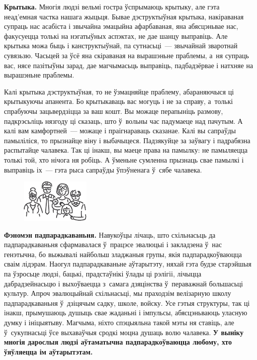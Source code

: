 \textbf{Крытыка.} Многія людзі вельмі гостра ўспрымаюць крытыку, але гэта неад'емная частка нашага жыцьця. Бывае дэструктыўная крытыка, накіраваная супраць нас асабіста і звычайна эмацыйна афарбаваная, яна абясцэньвае нас, факусуецца толькі на нэгатыўных аспэктах, не дае шанцу выправіць. Але крытыка можа быць і канструктыўнай, па сутнасьці~--- звычайнай зваротнай сувязьзю. Часьцей за ўсё яна скіраваная на вырашэньне праблемы, а~ня супраць вас, нясе пазітыўны зарад, дае магчымасьць выправіць, падбадзёрвае і натхняе на вырашэньне праблемы.

Калі крытыка дэструктыўная, то не ўзмацняйце праблему, абараняючыся ці крытыкуючы апанента. Бо крытыкаваць вас могуць і не за справу, а~толькі спрабуючы зацьвердзіцца за ваш кошт. Вы можаце перапыніць размову, падкрэсьліць нязгоду ці сказаць, што ў~вольны час падумаеце над пачутым. А калі вам камфортней~--- можаце і праігнараваць сказанае. Калі вы сапраўды памыліліся, то прызнайце віну і выбачыцеся. Падзякуйце за заўвагу і падрабязна распытайце чалавека. Так ці інакш, вы маеце права на памылку: не памыляецца толькі той, хто нічога ня робіць. А ўменьне сумленна прызнаць свае памылкі і выправіць іх~--- гэта рыса сапраўды ўпэўненага ў~сябе чалавека.

\begin{figure}[htb!]
  \centering
  \includegraphics[scale=1.5]{willpower/ch10/10.pdf}
\end{figure}


\textbf{Фэномэн падпарадкаваньня.} Навукоўцы лічаць, што схільнасьць да падпарадкаваньня сфармавалася ў~працэсе эвалюцыі і закладзена ў~нас генэтычна, бо выжывалі найбольш зладжаныя групы, якія падпарадкоўваюцца сваім лідэрам. Наогул падпарадкаваньне аўтарытэту, няхай гэта будзе старэйшыя па ўзросьце людзі, бацькі, прадстаўнікі ўлады ці рэлігіі, лічыцца дабрадзейнасьцю і выхоўваецца з~самага дзяцінства ў~пераважнай большасьці культур. Апроч эвалюцыйнай схільнасьці, мы праходзім велізарную школу падпарадкаваньня ў~дзіцячым садку, школе, войску. Усе гэтыя структуры, так ці інакш, прымушаюць душыць свае жаданьні і імпульсы, абясцэньваюць уласную думку і ініцыятыву. Магчыма, ніхто спэцыяльна такой мэты ня ставіць, але ў~сукупнасьці ўсе выхаваўчыя сродкі моцна душаць волю чалавека. \textbf{У выніку многія дарослыя людзі аўтаматычна падпарадкоўваюцца любому, хто ўяўляецца ім аўтарытэтам.}

